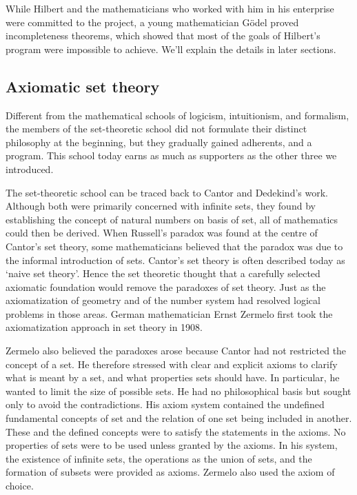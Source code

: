 \documentclass{article}
\begin{document}
While Hilbert and the mathematicians who worked with him in his enterprise were committed to the project, a young mathematician Gödel proved incompleteness theorems, which showed that most of the goals of Hilbert's program were impossible to achieve. We'll explain the details in later sections.

\subsection{Axiomatic set theory}

Different from the mathematical schools of logicism, intuitionism, and formalism, the members of the set-theoretic school did not formulate their distinct philosophy at the beginning, but they gradually gained adherents, and a program. This school today earns as much as supporters as the other three we introduced.

The set-theoretic school can be traced back to Cantor and Dedekind's work. Although both were primarily concerned with infinite sets, they found by establishing the concept of natural numbers on basis of set, all of mathematics could then be derived. When Russell's paradox was found at the centre of Cantor's set theory, some mathematicians believed that the paradox was due to the informal introduction of sets. Cantor's set theory is often described today as `naive set theory'. Hence the set theoretic thought that a carefully selected axiomatic foundation would remove the paradoxes of set theory. Just as the axiomatization of geometry and of the number system had resolved logical problems in those areas. German mathematician Ernst Zermelo first took the axiomatization approach in set theory in 1908.

Zermelo also believed the paradoxes arose because Cantor had not restricted the concept of a set. He therefore stressed with clear and explicit axioms to clarify what is meant by a set, and what properties sets should have. In particular, he wanted to limit the size of possible sets. He had no philosophical basis but sought only to avoid the contradictions. His axiom system contained the undefined fundamental concepts of set and the relation of one set being included in another. These and the defined concepts were to satisfy the statements in the axioms. No properties of sets were to be used unless granted by the axioms. In his system, the existence of infinite sets, the operations as the union of sets, and the formation of subsets were provided as axioms. Zermelo also used the axiom of choice\cite{M-Kline-2007}.
\end{document}

